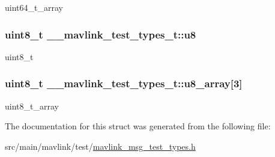 uint64\+\_\+t\+\_\+array 

\hypertarget{struct____mavlink__test__types__t_a2e20758d4738b63791dbb565f4134a59}{
\subsubsection[{u8}]{\setlength{\rightskip}{0pt plus 5cm}uint8\+\_\+t \+\_\+\+\_\+mavlink\+\_\+test\+\_\+types\+\_\+t\+::u8}}\label{struct____mavlink__test__types__t_a2e20758d4738b63791dbb565f4134a59}


uint8\+\_\+t 

\hypertarget{struct____mavlink__test__types__t_afb8ac88552de20b7e236357ede428cb5}{
\subsubsection[{u8\+\_\+array}]{\setlength{\rightskip}{0pt plus 5cm}uint8\+\_\+t \+\_\+\+\_\+mavlink\+\_\+test\+\_\+types\+\_\+t\+::u8\+\_\+array\mbox{[}3\mbox{]}}}\label{struct____mavlink__test__types__t_afb8ac88552de20b7e236357ede428cb5}


uint8\+\_\+t\+\_\+array 



The documentation for this struct was generated from the following file\+:\begin{DoxyCompactItemize}
\item 
src/main/mavlink/test/\hyperlink{mavlink__msg__test__types_8h}{mavlink\+\_\+msg\+\_\+test\+\_\+types.\+h}\end{DoxyCompactItemize}
